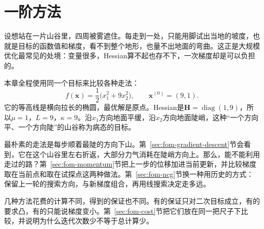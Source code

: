 \chapter{一阶方法}
\label{chap:first-order-methods}

设想站在一片山谷里，四周被雾遮住。每走到一处，只能用脚试出当地的坡度，也就是目标的函数值和梯度，看不到整个地形，也量不出地面的弯曲。这正是大规模优化最常见的处境：变量很多，Hessian算不起也存不下，一次梯度却是可以负担的。

本章全程使用同一个目标来比较各种走法：
\begin{equation}
 f(\bm{x})=\frac12\bigl(x_1^2+9x_2^2\bigr),\qquad
 \bm{x}^{(0)}=(9,1).
 \label{eq:fom-example}
\end{equation}
它的等高线是横向拉长的椭圆，最优解是原点。Hessian是$\bm{H}=\operatorname{diag}(1,9)$，所以$\mu=1$，$L=9$，$\kappa=9$。沿$x_1$方向地面平缓，沿$x_2$方向地面陡峭，这种“一个方向平、一个方向陡”的山谷称为病态的目标。

最朴素的走法是每步顺着最陡的方向下山。第~\ref{sec:fom-gradient-descent}节会看到，它在这个山谷里左右折返，大部分力气消耗在陡峭方向上。那么，能不能利用走过的路？第~\ref{sec:fom-momentum}节把上一步的位移加进当前更新，并比较梯度取在当前点和取在试探点这两种做法。第~\ref{sec:fom-ncg}节换一种用历史的方式：保留上一轮的搜索方向，与新梯度组合，再用线搜索决定走多远。

几种方法花费的计算不同，得到的保证也不同。有的保证只对二次目标成立，有的要求凸，有的只能说梯度变小。第~\ref{sec:fom-cost}节把它们放在同一把尺子下比较，并说明为什么迭代次数少不等于总计算少。






